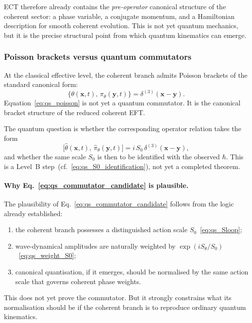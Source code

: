 ECT therefore already contains the \emph{pre-operator} canonical
structure of the coherent sector: a phase variable, a conjugate
momentum, and a Hamiltonian description for smooth coherent evolution.
This is not yet quantum mechanics, but it is the precise structural
point from which quantum kinematics can emerge.

\subsubsection*{Poisson brackets versus quantum commutators}

At the classical effective level, the coherent branch admits Poisson
brackets of the standard canonical form:
\begin{equation}
  \label{eq:qs_poisson}
  \bigl\{\theta(\mathbf{x},t),\,\pi_\theta(\mathbf{y},t)\bigr\}
  =
  \delta^{(3)}(\mathbf{x}-\mathbf{y}).
\end{equation}
Equation~\eqref{eq:qs_poisson} is not yet a quantum commutator.
It is the canonical bracket structure of the reduced coherent EFT.

The quantum question is whether the corresponding operator relation
takes the form
\begin{equation}
  \label{eq:qs_commutator_candidate}
  \bigl[\hat\theta(\mathbf{x},t),\,\hat\pi_\theta(\mathbf{y},t)\bigr]
  =
  i\,S_0\,\delta^{(3)}(\mathbf{x}-\mathbf{y}),
\end{equation}
and whether the same scale $S_0$ is then to be identified with the
observed $\hbar$.
This is a Level~B step~(cf.~\eqref{eq:qs_S0_identification}),
not yet a completed theorem.

\paragraph{Why Eq.~\eqref{eq:qs_commutator_candidate} is plausible.}
The plausibility of Eq.~\eqref{eq:qs_commutator_candidate} follows from
the logic already established:
\begin{enumerate}[label=(\roman*)]
  \item the coherent branch possesses a distinguished action scale
    $S_0$~\eqref{eq:qs_Sloop};
  \item wave-dynamical amplitudes are naturally weighted by
    $\exp(iS_\theta/S_0)$~\eqref{eq:qs_weight_S0};
  \item canonical quantisation, if it emerges, should be normalised by
    the same action scale that governs coherent phase weights.
\end{enumerate}
This does not yet prove the commutator.
But it strongly constrains what its normalisation should be if the
coherent branch is to reproduce ordinary quantum kinematics.

